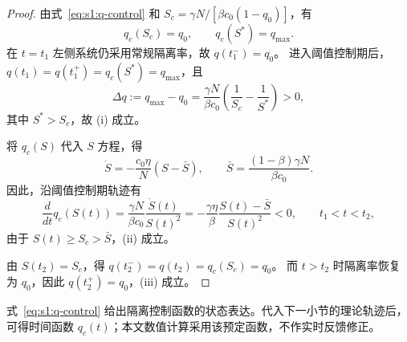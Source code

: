 \documentclass[lang=cn,a4paper,newtx]{elegantpaper}
\numberwithin{equation}{section}
\theoremstyle{plain}
\begin{document}
\begin{proof}
由式~\eqref{eq:s1:q-control} 和 $S_c=\gamma N/[\beta c_0(1-q_0)]$，有
\[
q_c(S_c)=q_0,\qquad q_c(S^*)=q_{\max}.
\]
在 $t=t_1$ 左侧系统仍采用常规隔离率，故 $q(t_1^-)=q_0$。
进入阈值控制期后，$q(t_1)=q(t_1^+)=q_c(S^*)=q_{\max}$，且
\[
\Delta q:=q_{\max}-q_0
=\frac{\gamma N}{\beta c_0}
\left(\frac{1}{S_c}-\frac{1}{S^*}\right)>0,
\]
其中 $S^*>S_c$，故 (i) 成立。

将 $q_c(S)$ 代入 $S$ 方程，得
\[
\dot S=-\frac{c_0\eta}{N}(S-\bar S),\qquad
\bar S=\frac{(1-\beta)\gamma N}{\beta c_0}.
\]
因此，沿阈值控制期轨迹有
\[
\frac{d}{dt}q_c(S(t))
=\frac{\gamma N}{\beta c_0}\frac{\dot S(t)}{S(t)^2}
=-\frac{\gamma\eta}{\beta}\frac{S(t)-\bar S}{S(t)^2}<0,
\qquad t_1<t<t_2,
\]
由于 $S(t)\ge S_c>\bar S$，(ii) 成立。

由 $S(t_2)=S_c$，得 $q(t_2^-)=q(t_2)=q_c(S_c)=q_0$。
而 $t>t_2$ 时隔离率恢复为 $q_0$，因此 $q(t_2^+)=q_0$，(iii) 成立。
\end{proof}

\begin{remark}
式~\eqref{eq:s1:q-control} 给出隔离控制函数的状态表达。代入下一小节的理论轨迹后，可得时间函数 $q_c(t)$；本文数值计算采用该预定函数，不作实时反馈修正。
\end{remark}
\end{document}

